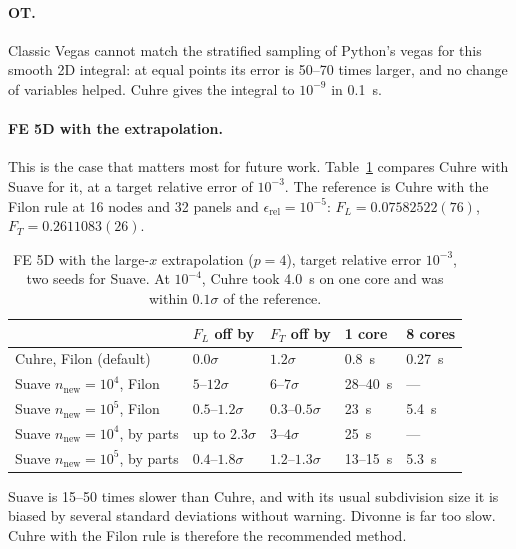\documentclass[11pt,a4paper]{article}
\begin{document}
\paragraph{OT.} Classic Vegas cannot match the stratified sampling of Python's
vegas for this smooth 2D integral: at equal points its error is 50--70 times
larger, and no change of variables helped. Cuhre gives the integral to
$10^{-9}$ in 0.1~s.

\paragraph{FE 5D with the extrapolation.} This is the case that matters most
for future work. Table~\ref{tab:suave} compares Cuhre with Suave for it, at a
target relative error of $10^{-3}$. The reference is Cuhre with the Filon rule
at 16 nodes and 32 panels and $\epsilon_{\text{rel}} = 10^{-5}$:
$F_L = 0.07582522(76)$, $F_T = 0.2611083(26)$.

\begin{table}[ht]
  \centering
  \small
  \begin{tabular}{lllll}
    \toprule
    & $F_L$ off by & $F_T$ off by & 1 core & 8 cores \\
    \midrule
    Cuhre, Filon (default)            & $0.0\sigma$ & $1.2\sigma$ & 0.8~s & 0.27~s \\
    Suave $n_{\text{new}} = 10^4$, Filon & $5$--$12\sigma$ & $6$--$7\sigma$ & 28--40~s & --- \\
    Suave $n_{\text{new}} = 10^5$, Filon & $0.5$--$1.2\sigma$ & $0.3$--$0.5\sigma$ & 23~s & 5.4~s \\
    Suave $n_{\text{new}} = 10^4$, by parts & up to $2.3\sigma$ & $3$--$4\sigma$ & 25~s & --- \\
    Suave $n_{\text{new}} = 10^5$, by parts & $0.4$--$1.8\sigma$ & $1.2$--$1.3\sigma$ & 13--15~s & 5.3~s \\
    \bottomrule
  \end{tabular}
  \caption{FE 5D with the large-$x$ extrapolation ($p = 4$), target relative
    error $10^{-3}$, two seeds for Suave. At $10^{-4}$, Cuhre took 4.0~s on one
    core and was within $0.1\sigma$ of the reference.}
  \label{tab:suave}
\end{table}

Suave is 15--50 times slower than Cuhre, and with its usual subdivision size
it is biased by several standard deviations without warning. Divonne is far too
slow. Cuhre with the Filon rule is therefore the recommended method.
\end{document}
